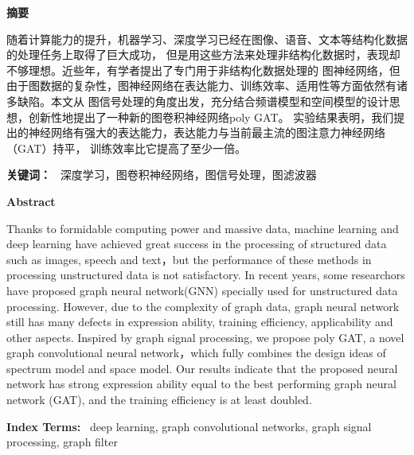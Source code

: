 \cleardoublepage{}
\begin{center}
    \bfseries {} 摘要
\end{center}

随着计算能力的提升，机器学习、深度学习已经在图像、语音、文本等结构化数据的处理任务上取得了巨大成功，
但是用这些方法来处理非结构化数据时，表现却不够理想。近些年，有学者提出了专门用于非结构化数据处理的
图神经网络，但由于图数据的复杂性，图神经网络在表达能力、训练效率、适用性等方面依然有诸多缺陷。本文从
图信号处理的角度出发，充分结合频谱模型和空间模型的设计思想，创新性地提出了一种新的图卷积神经网络poly GAT。
实验结果表明，我们提出的神经网络有强大的表达能力，表达能力与当前最主流的图注意力神经网络（GAT）持平，
训练效率比它提高了至少一倍。

\noindent \textbf{关键词：} \ 深度学习，图卷积神经网络，图信号处理，图滤波器


\cleardoublepage{}
\begin{center}
    \bfseries {} Abstract
\end{center}

Thanks to formidable computing power and massive data, machine learning and deep learning have achieved great 
success in the processing of structured data such as images, speech and text，but the 
performance of these methods in processing unstructured data is not satisfactory. 
In recent years, some researchors have proposed graph neural network(GNN) specially used for unstructured data processing. 
However, due to the complexity of graph data, graph neural network still has many defects in expression ability, 
training efficiency, applicability and other aspects. Inspired by graph signal processing, we propose poly GAT, 
a novel graph convolutional neural network，which fully combines the design ideas of spectrum model and space model. 
Our results indicate that the proposed neural network has strong expression ability equal to the best performing 
graph neural network (GAT), and the training efficiency is at least doubled.

\noindent \textbf{Index Terms:} \  deep learning, graph convolutional networks, graph signal processing, graph filter